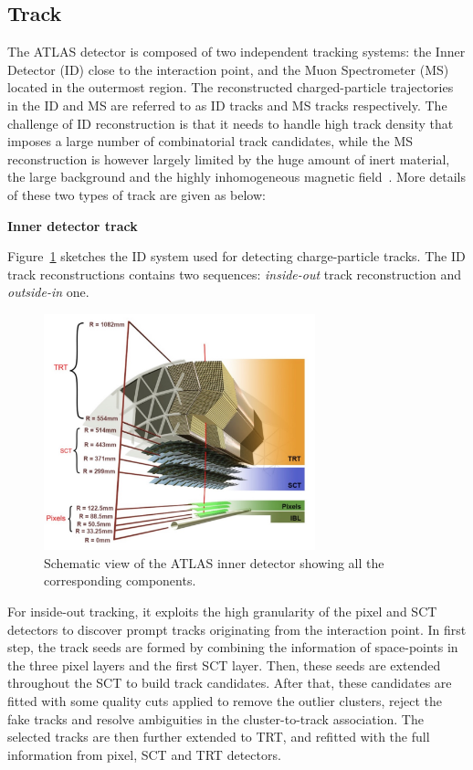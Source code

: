 \subsection{Track}
\label{sec:track}

The ATLAS detector is composed of two independent tracking systems: the Inner Detector (ID) close to the interaction point, and the Muon Spectrometer (MS) located in the outermost region.
The reconstructed charged-particle trajectories in the ID and MS are referred to as ID tracks and MS tracks respectively.
The challenge of ID reconstruction is that it needs to handle high track density that imposes a large number of combinatorial track candidates, 
while the MS reconstruction is however largely limited by the huge amount of inert material, the large background and the highly inhomogeneous magnetic field~\cite{Cornelissen:1020106}.
More details of these two types of track are given as below:

\textbf{Inner detector track}

Figure~\ref{fig:track_ID} sketches the ID system used for detecting charge-particle tracks.
The ID track reconstructions contains two sequences: \textit{inside-out} track reconstruction and \textit{outside-in} one.
\begin{figure}[!htb]
  \centering
  \includegraphics[width=0.7\textwidth]{figures/Simulation/track_ID.png}
  \caption{Schematic view of the ATLAS inner detector showing all the corresponding components.}
  \label{fig:track_ID}
\end{figure}

For inside-out tracking, it exploits the high granularity of the pixel and SCT detectors to discover prompt tracks originating from the interaction point.
In first step, the track seeds are formed by combining the information of space-points in the three pixel layers and the first SCT layer.
Then, these seeds are extended throughout the SCT to build track candidates.
After that, these candidates are fitted with some quality cuts applied to remove the outlier clusters, reject the fake tracks and resolve ambiguities in the cluster-to-track association.
The selected tracks are then further extended to TRT, and refitted with the full information from pixel, SCT and TRT detectors.

